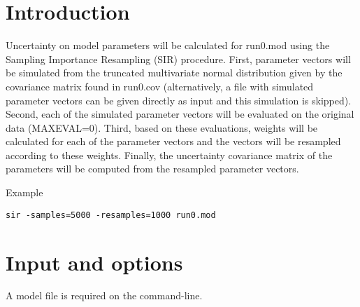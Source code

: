 



\maketitle


\section{Introduction}
Uncertainty on model parameters will be calculated for run0.mod using the Sampling Importance Resampling (SIR) procedure.
First, parameter vectors will be simulated from the truncated multivariate normal distribution given by the covariance matrix found in run0.cov
(alternatively, a file with simulated parameter vectors can be given directly as input and this simulation is skipped).
Second, each of the simulated parameter vectors will be evaluated on the original data (MAXEVAL=0).
Third, based on these evaluations, weights will be calculated for each of the parameter vectors and the vectors 
will be resampled according to these weights. Finally, the uncertainty covariance matrix of the parameters 
will be computed from the resampled parameter vectors.

Example
\begin{verbatim}
sir -samples=5000 -resamples=1000 run0.mod
\end{verbatim}

\section{Input and options}
A model file is required on the command-line.

